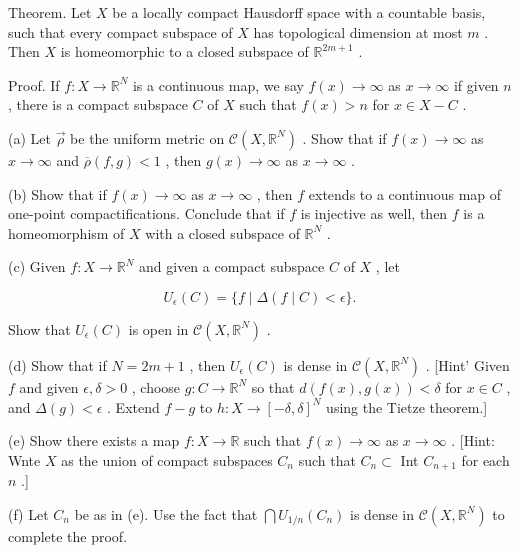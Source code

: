 \documentclass[10pt]{article}
\begin{document}
Theorem. Let \(X\) be a locally compact Hausdorff space with a countable basis, such that every compact subspace of \(X\) has topological dimension at most \(m\) . Then \(X\) is homeomorphic to a closed subspace of \({\mathbb{R}}^{{2m} + 1}\) .

Proof. If \(f : X \rightarrow  {\mathbb{R}}^{N}\) is a continuous map, we say \(f\left( x\right)  \rightarrow  \infty\) as \(x \rightarrow  \infty\) if given \(n\) , there is a compact subspace \(C\) of \(X\) such that \(f\left( x\right)  > n\) for \(x \in  X - C\) .

(a) Let \(\overrightarrow{\rho }\) be the uniform metric on \(\mathcal{C}\left( {X,{\mathbb{R}}^{N}}\right)\) . Show that if \(f\left( x\right)  \rightarrow  \infty\) as \(x \rightarrow  \infty\) and \(\overline{\rho }\left( {f,g}\right)  < 1\) , then \(g\left( x\right)  \rightarrow  \infty\) as \(x \rightarrow  \infty\) .

(b) Show that if \(f\left( x\right)  \rightarrow  \infty\) as \(x \rightarrow  \infty\) , then \(f\) extends to a continuous map of one-point compactifications. Conclude that if \(f\) is injective as well, then \(f\) is a homeomorphism of \(X\) with a closed subspace of \({\mathbb{R}}^{N}\) .

(c) Given \(f : X \rightarrow  {\mathbb{R}}^{N}\) and given a compact subspace \(C\) of \(X\) , let

\[
{U}_{\epsilon }\left( C\right)  = \{ f \mid  \Delta \left( {f \mid  C}\right)  < \epsilon \} .
\]

Show that \({U}_{\epsilon }\left( C\right)\) is open in \(\mathcal{C}\left( {X,{\mathbb{R}}^{N}}\right)\) .

(d) Show that if \(N = {2m} + 1\) , then \({U}_{\epsilon }\left( C\right)\) is dense in \(\mathcal{C}\left( {X,{\mathbb{R}}^{N}}\right)\) . [Hint’ Given \(f\) and given \(\epsilon ,\delta  > 0\) , choose \(g : C \rightarrow  {\mathbb{R}}^{N}\) so that \(d\left( {f\left( x\right) ,g\left( x\right) }\right)  < \delta\) for \(x \in  C\) , and \(\Delta \left( g\right)  < \epsilon\) . Extend \(f - g\) to \(h : X \rightarrow  {\left\lbrack  -\delta ,\delta \right\rbrack  }^{N}\) using the Tietze theorem.]

(e) Show there exists a map \(f : X \rightarrow  \mathbb{R}\) such that \(f\left( x\right)  \rightarrow  \infty\) as \(x \rightarrow  \infty\) . [Hint: Wnte \(X\) as the union of compact subspaces \({C}_{n}\) such that \({C}_{n} \subset\) Int \({C}_{n + 1}\) for each \(n\) .]

(f) Let \({C}_{n}\) be as in (e). Use the fact that \(\bigcap {U}_{1/n}\left( {C}_{n}\right)\) is dense in \(\mathcal{C}\left( {X,{\mathbb{R}}^{N}}\right)\) to complete the proof.
\end{document}
